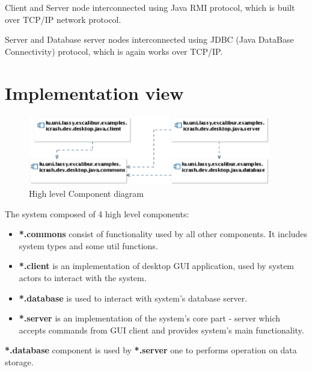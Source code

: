Client and Server node interconnected using Java RMI protocol, which is built
over TCP/IP network protocol.
 
Server and Database server nodes interconnected using JDBC (Java DataBase
Connectivity) protocol, which is again works over TCP/IP.

\section{Implementation view}

\begin{figure}[H]
\begin{center}
  \includegraphics[width=400px]{images/architecture/implementation-view/highest_level.eps}
  \caption{High level Component diagram}
  \label{high_level_comp_diag}
\end{center}
\end{figure}

The system composed of 4 high level components:
\begin{itemize}
  \item \textbf{*.commons} consist of functionality used by all other components. It
  includes system types and some util functions.
  \item \textbf{*.client} is an implementation of desktop GUI application, used by system
  actors to interact with the system.
  \item \textbf{*.database} is used to interact with system's database server.
  \item \textbf{*.server} is an implementation of the system's core part - server which
  accepts commands from GUI client and provides system's main functionality.
\end{itemize}

\textbf{*.database} component is used by \textbf{*.server} one to performs
operation on data storage.




